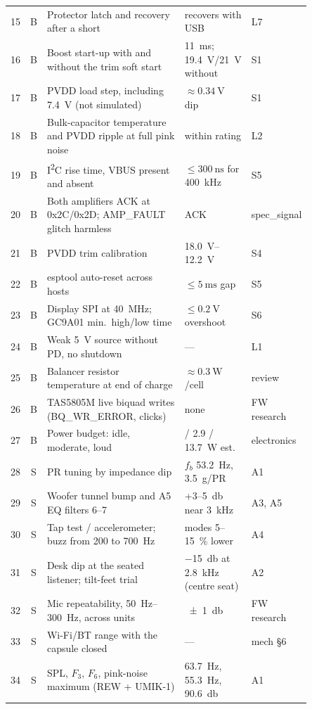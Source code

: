 {\begin{longtable}{@{}r c >{\raggedright\arraybackslash}p{0.52\linewidth} >{\raggedright\arraybackslash}p{0.21\linewidth} >{\raggedright\arraybackslash}p{0.12\linewidth}@{}}
15 & B & Protector latch and recovery after a short & recovers with USB & L7 \\
16 & B & Boost start-up with and without the trim soft start & \qty{11}{\milli\second}; \qty{19.4}{\volt}/\qty{21}{\volt} without & S1 \\
17 & B & PVDD load step, including \qty{7.4}{\volt} (not simulated) & $\approx\qty{0.34}{\volt}$ dip & S1 \\
18 & B & Bulk-capacitor temperature and PVDD ripple at full pink noise & within rating & L2 \\
19 & B & I\textsuperscript{2}C rise time, VBUS present and absent & $\le\qty{300}{\nano\second}$ for \qty{400}{\kilo\hertz} & S5 \\
20 & B & Both amplifiers ACK at 0x2C/0x2D; AMP\_FAULT glitch harmless & ACK & spec\_signal \\
21 & B & PVDD trim calibration & \qtyrange{18.0}{12.2}{\volt} & S4 \\
22 & B & esptool auto-reset across hosts & $\le\qty{5}{\milli\second}$ gap & S5 \\
23 & B & Display SPI at \qty{40}{\mega\hertz}; GC9A01 min.\ high/low time & $\le\qty{0.2}{\volt}$ overshoot & S6 \\
24 & B & Weak \qty{5}{\volt} source without PD, no shutdown & --- & L1 \\
25 & B & Balancer resistor temperature at end of charge & $\approx\qty{0.3}{\watt}$/cell & review \\
26 & B & TAS5805M live biquad writes (BQ\_WR\_ERROR, clicks) & none & FW research \\
27 & B & Power budget: idle, moderate, loud & 1.65 / 2.9 / \qty{13.7}{\watt} est. & electronics \\
28 & S & PR tuning by impedance dip & $f_b$ \qty{53.2}{\hertz}, \qty{3.5}{\gram}/PR & A1 \\
29 & S & Woofer tunnel bump and A5 EQ filters 6--7 & +3--\qty{5}{\decibel} near \qty{3}{\kilo\hertz} & A3, A5 \\
30 & S & Tap test / accelerometer; buzz from 200 to \qty{700}{\hertz} & modes 5--\qty{15}{\percent} lower & A4 \\
31 & S & Desk dip at the seated listener; tilt-feet trial & \qty{-15}{\decibel} at \qty{2.8}{\kilo\hertz} (centre seat) & A2 \\
32 & S & Mic repeatability, \qtyrange{50}{300}{\hertz}, across units & \qty{\pm1}{\decibel} & FW research \\
33 & S & Wi-Fi/BT range with the capsule closed & --- & mech §6 \\
34 & S & SPL, $F_3$, $F_6$, pink-noise maximum (REW + UMIK-1) & \qty{63.7}{\hertz}, \qty{55.3}{\hertz}, \qty{90.6}{\decibel} & A1 \\
\end{longtable}
}


